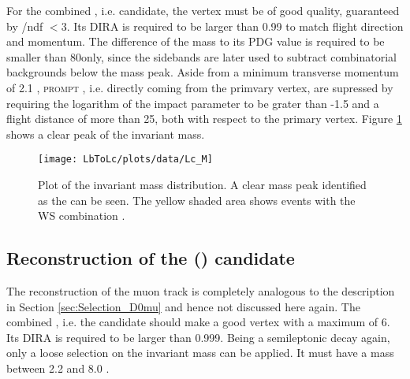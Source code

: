For the combined \pKpi, i.e. \Lc candidate, the vertex must be of good quality, guaranteed by \chisqvtx/ndf $< 3$.
Its DIRA is required to be larger than 0.99 to match flight direction and momentum.
The difference of the \Lc mass to its PDG value is required to be smaller than 80\mev only, since the \Lc sidebands are later used to subtract combinatorial backgrounds below the \Lc mass peak.
Aside from a minimum transverse momentum of 2.1 \gev, \textsc{prompt} \Lc, i.e. \Lc directly coming from the primvary vertex, are supressed by requiring the logarithm of the \Lc impact parameter to be grater than -1.5 and a flight distance \chisq of more than 25, both with respect to the primary vertex.
Figure \ref{fig:plot_Lc_M} shows a clear peak of the invariant \Lc mass.
\begin{figure}[tb]
    \centering
	\texttt{[image: LbToLc/plots/data/Lc\_M]}	
	\caption{Plot of the invariant \pKpi mass distribution. A clear mass peak identified as the \Lc can be seen. The yellow shaded area shows events with the WS combination \Lc\mup.}
	\label{fig:plot_Lc_M}
\end{figure}

\subsection{Reconstruction of the \Lb (\Lc\mun) candidate}
The reconstruction of the muon track is completely analogous to the description in Section \ref{sec:Selection_D0mu} and hence not discussed here again.
The combined \Lc\mun, i.e. the \Lb candidate should make a good vertex with a maximum \chisqvtx of 6.
Its DIRA is required to be larger than 0.999.
Being a semileptonic decay again, only a loose selection on the invariant \Lc\mun mass can be applied.
It must have a mass between 2.2 and 8.0 \gev.

